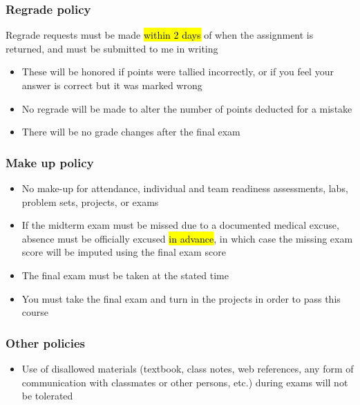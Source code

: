 \documentclass[slidestop,compress,mathserif,12pt,t,professionalfonts,xcolor=table]{beamer}
\begin{document}

\begin{frame}
\frametitle{Regrade policy}

Regrade requests must be made \hl{within 2 days} of when the assignment is returned, and must be submitted to me in writing 

\begin{itemize}

\item These will be honored if points were tallied incorrectly, or if you feel your answer is correct but it was marked wrong

\item No regrade will be made to alter the number of points deducted for a mistake

\item There will be no grade changes after the final exam

\end{itemize}

\end{frame}


\begin{frame}
\frametitle{Make up policy}

\begin{itemize}

\item No make-up for attendance, individual and team readiness assessments, labs, problem sets, projects, or exams

\item If the midterm exam must be missed due to a documented medical excuse, absence must be officially excused \hl{in advance}, in which case the missing exam score will be imputed using the final exam score

\item The final exam must be taken at the stated time

\item You must take the final exam and turn in the projects in order to pass this course

\end{itemize}

\end{frame}


\begin{frame}
\frametitle{Other policies}

\begin{itemize}

\item Use of disallowed materials (textbook, class notes, web references, any form of communication with classmates or other persons, etc.) during exams will not be tolerated

\end{itemize}

\end{frame}
\end{document}
